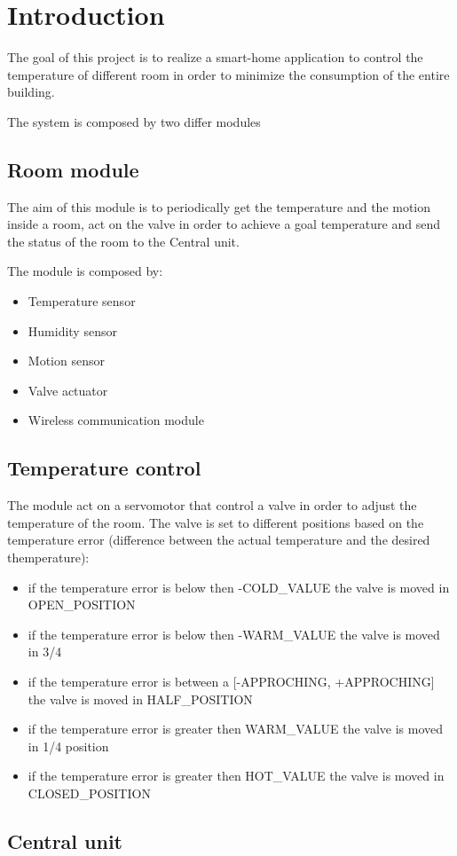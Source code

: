 \section{Introduction}
The goal of this project is to realize a smart-home application to control the temperature of different room in order to minimize the consumption of the entire building.

The system is composed by two differ modules

\subsection{Room module}
The aim of this module is to periodically get the temperature and the motion inside a room,
act on the valve in order to achieve a goal temperature and send the status of the room to the
Central unit.

The module is composed by:
\begin{itemize}
	\item Temperature sensor
	\item Humidity sensor
	\item Motion sensor
	\item Valve actuator
	\item Wireless communication module
\end{itemize}

\subsection{Temperature control}
The module act on a servomotor that control a valve in order to adjust the temperature of the room.
The valve is set to different positions based on the temperature error (difference between the actual temperature and the desired themperature):
\begin{itemize}
	\item if the temperature error is below then -COLD_VALUE the valve is moved in OPEN_POSITION
	\item if the temperature error is below then -WARM_VALUE the valve is moved in 3/4
	\item if the temperature error is between a [-APPROCHING, +APPROCHING] the valve is moved in HALF_POSITION
	\item if the temperature error is greater then WARM_VALUE the valve is moved in 1/4 position
	\item if the temperature error is greater then HOT_VALUE the valve is moved in CLOSED_POSITION
\end{itemize}


\subsection{Central unit}